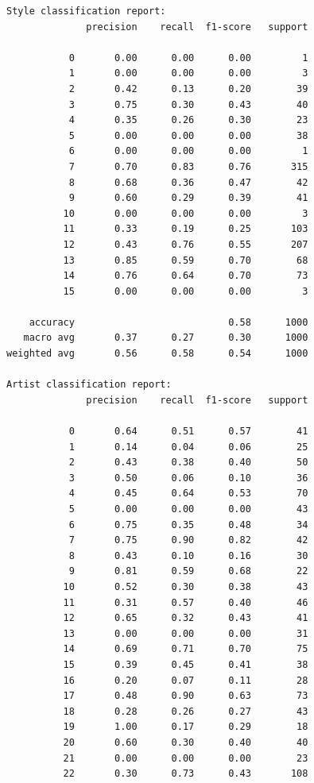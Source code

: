 \documentclass[11pt]{article}
\begin{document}
    
    \begin{Verbatim}[commandchars=\\\{\}]
Style classification report:
              precision    recall  f1-score   support

           0       0.00      0.00      0.00         1
           1       0.00      0.00      0.00         3
           2       0.42      0.13      0.20        39
           3       0.75      0.30      0.43        40
           4       0.35      0.26      0.30        23
           5       0.00      0.00      0.00        38
           6       0.00      0.00      0.00         1
           7       0.70      0.83      0.76       315
           8       0.68      0.36      0.47        42
           9       0.60      0.29      0.39        41
          10       0.00      0.00      0.00         3
          11       0.33      0.19      0.25       103
          12       0.43      0.76      0.55       207
          13       0.85      0.59      0.70        68
          14       0.76      0.64      0.70        73
          15       0.00      0.00      0.00         3

    accuracy                           0.58      1000
   macro avg       0.37      0.27      0.30      1000
weighted avg       0.56      0.58      0.54      1000

Artist classification report:
              precision    recall  f1-score   support

           0       0.64      0.51      0.57        41
           1       0.14      0.04      0.06        25
           2       0.43      0.38      0.40        50
           3       0.50      0.06      0.10        36
           4       0.45      0.64      0.53        70
           5       0.00      0.00      0.00        43
           6       0.75      0.35      0.48        34
           7       0.75      0.90      0.82        42
           8       0.43      0.10      0.16        30
           9       0.81      0.59      0.68        22
          10       0.52      0.30      0.38        43
          11       0.31      0.57      0.40        46
          12       0.65      0.32      0.43        41
          13       0.00      0.00      0.00        31
          14       0.69      0.71      0.70        75
          15       0.39      0.45      0.41        38
          16       0.20      0.07      0.11        28
          17       0.48      0.90      0.63        73
          18       0.28      0.26      0.27        43
          19       1.00      0.17      0.29        18
          20       0.60      0.30      0.40        40
          21       0.00      0.00      0.00        23
          22       0.30      0.73      0.43       108


\end{Verbatim}
\end{document}
